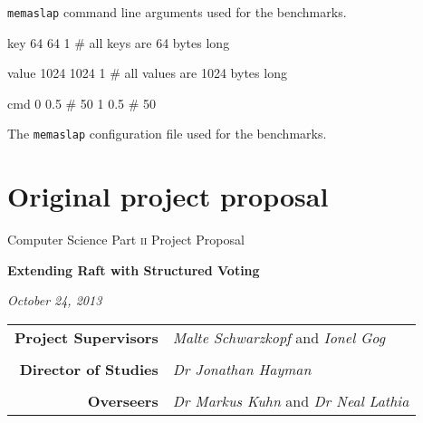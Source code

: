 \documentclass[12pt,chapterprefix=true,toc=bibliography,numbers=noendperiod,
               footnotes=multiple,twoside]{scrreprt}
\begin{document}
\begin{listing}[H]
    \caption{\texttt{memaslap} command line arguments used for the benchmarks.}
    \label{lst:memaslap-args}
\end{listing}

\begin{listing}[H]
    \begin{bashcode}
key
64      64      1   # all keys are 64 bytes long

value
1024    1024    1   # all values are 1024 bytes long

cmd
0   0.5             # 50%
1   0.5             # 50%
    \end{bashcode}
    \caption{The \texttt{memaslap} configuration file used for the benchmarks.}
    \label{lst:memaslap-conf}
\end{listing}

\chapter{Original project proposal}
\label{ch:original-proposal}




\vfil

\centerline{\large Computer Science Part \textsc{ii} Project Proposal} \vspace{0.4in}
\centerline{\Large\textbf{Extending Raft with Structured Voting}} \vspace{0.3in}
\centerline{\large\textit{October 24, 2013}}

\vfil

\begin{center}
\begin{tabularx}{316pt}{rX}
\textbf{Project Supervisors} & \textit{Malte Schwarzkopf} and \textit{Ionel Gog} \\ \\
\textbf{Director of Studies} & \textit{Dr Jonathan Hayman} \\ \\
\textbf{Overseers} & \textit{Dr Markus Kuhn} and \textit{Dr Neal Lathia}
\end{tabularx}
\end{center}
\end{document}
